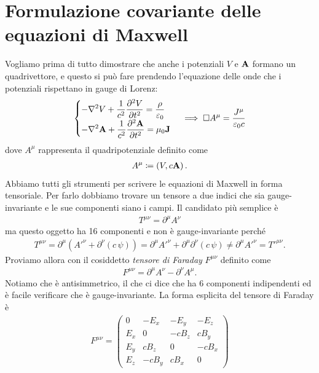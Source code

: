 \section{Formulazione covariante delle equazioni di Maxwell}
Vogliamo prima di tutto dimostrare che anche i potenziali $ V $ e $ \v{A} $ formano un quadrivettore, e questo si può fare prendendo l'equazione delle 
onde che i potenziali rispettano in gauge di Lorenz:
\begin{align}
  \begin{cases}
    \DS -\nabla^2V + \frac{1}{c^2} \der[2]{V}{t} = \frac{\rho}{\eps_0} \\
    \DS -\nabla^2\v{ A } + \frac{1}{c^2} \der[2]{\v{ A }}{t} = \mu_0\v{ J }
  \end{cases}
  \implies \Box A^\mu = \frac{J^\mu}{\eps_0 c}
\end{align}
dove $ A^\mu $ rappresenta il quadripotenziale definito come 
\begin{align}
  A^\mu \coloneq \left( V, c \v{A} \right).
\end{align}
Abbiamo tutti gli strumenti per scrivere le equazioni di Maxwell in forma tensoriale. Per farlo dobbiamo trovare un tensore a due indici che sia 
gauge-invariante e le sue componenti siano i campi. Il candidato più semplice è 
\begin{align}
  T^{\mu \nu} = \partial^\mu A^\nu
\end{align}
ma questo oggetto ha 16 componenti e non è gauge-invariante perché
\begin{align}
  T^{\mu \nu} = \partial^\mu \left( A'^\nu + \partial^\nu(c\,\psi) \right) 
  = \partial^\mu A'^\nu + \partial^\mu\partial^\nu(c\,\psi) \neq \partial^\mu A'^\nu = T'^{\mu \nu}.
\end{align}
Proviamo allora con il cosiddetto \textit{tensore di Faraday} $ F^{\mu \nu} $ definito come
\begin{align}
  F^{\mu \nu} = \partial^\mu A^\nu - \partial^\nu A^\mu.
\end{align}
Notiamo che è antisimmetrico, il che ci dice che ha $ 6 $ componenti indipendenti ed è facile verificare che è gauge-invariante. La forma esplicita del 
tensore di Faraday è 
\begin{align}
  F^{\mu \nu} =
  \begin{pmatrix}
    0 & -E_x & -E_y & -E_z \\
    E_x & 0 & -c B_z & c B_y \\
    E_y & c B_z & 0 & -c B_x \\
    E_z & -c B_y & c B_x & 0 
  \end{pmatrix}
\end{align}

